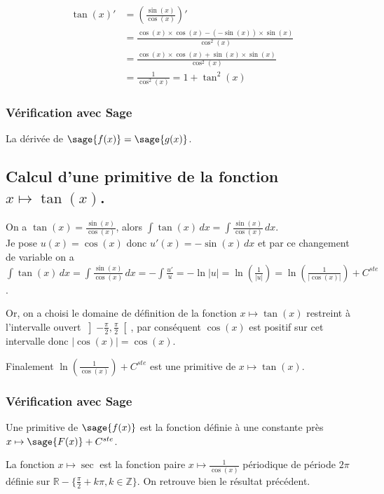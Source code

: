 \documentclass[a4paper,landscape,17pt]{extreport} %
\def\eclaire{\mathbb}
\def\R{\ensuremath{\eclaire R}}
\def\Z{\ensuremath{\eclaire Z}}
\begin{document}
\begin{align*}
\tan(x)' 
& =  \left(\frac{\sin(x)}{\cos(x)}\right)' \\ 
& =  \frac{\cos(x) \times \cos(x) - (-\sin(x)) \times \sin(x)}{\cos^2(x)}  \\ 
& =  \frac{\cos(x) \times \cos(x) + \sin(x)\times \sin(x)}{\cos^2(x)}  \\ 
& =  \frac{1}{\cos^2(x)} = 1 + \tan^2(x)
\end{align*}

\subsubsection{Vérification avec Sage}


La dérivée de $\sage{f(x)} = \sage{g(x)} $.


\subsection{Calcul d'une primitive de la fonction  $x \mapsto \tan(x)$.}

On a $\tan(x)=\frac{\sin(x)}{\cos(x)}$, alors $\int \tan(x) \, dx =\int \frac{\sin(x)}{\cos(x)}\, dx$.\\
Je pose $u(x)=\cos(x)$ donc $u'(x)= -\sin(x) \,dx$ et par ce changement de variable on a $\int \tan(x) \, dx = \int \frac{\sin(x)}{\cos(x)}\, dx  = -\int \frac{u'}{u} = -\ln|u|  = \ln\left(\frac{1}{|u|}\right)  = \ln\left(\frac{1}{|\cos(x)|}\right) +C^{ste}$.

Or, on a choisi le domaine de définition de la fonction $x \mapsto \tan(x)$ restreint à l'intervalle ouvert $ \left] -\frac{\pi}{ 2} , \frac{\pi}{ 2} \right[ $, par conséquent $\cos(x)$ est positif sur cet intervalle donc $|\cos(x)| = \cos(x)$.

Finalement $ \ln\left(\frac{1}{\cos(x)}\right) +C^{ste}$ est une primitive de $x \mapsto \tan(x)$.


\subsubsection*{Vérification avec Sage}


Une primitive de $\sage{f(x)}$ est la fonction définie à une constante près $x \mapsto \sage{F(x)} + C^{ste} $.

La fonction $x\mapsto \sec$ est la fonction paire $x\mapsto \frac{1}{\cos(x)}$ périodique de période $2\pi$ définie sur $\R-\{ \frac{\pi}{2}+k\pi, k\in\Z\}$. On retrouve bien le résultat précédent.
\end{document}
